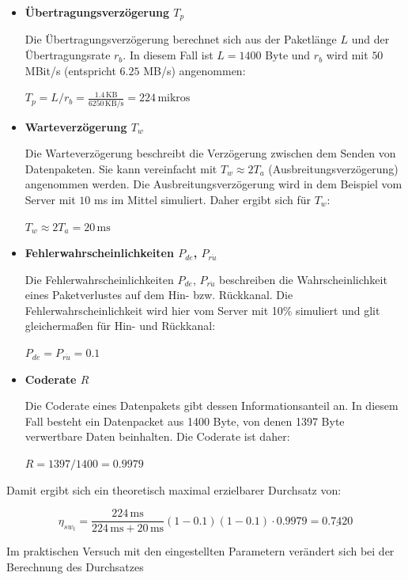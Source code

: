 \documentclass{article}
\begin{document}
			\begin{itemize}

				\item \textbf{Übertragungsverzögerung $T_p$}

				Die Übertragungsverzögerung berechnet sich aus der Paketlänge $L$ und der Übertragungsrate $r_b$. In diesem Fall ist $L = 1400$ Byte und $r_b$ wird mit $50$ MBit/s (entspricht $6.25$ MB/s) angenommen:

				$T_p = L/r_b = \frac{1.4\,\text{KB}}{6250\,\text{KB/s}} = 224\,\text{mikros} $

				\item \textbf{Warteverzögerung $T_w$}

				Die Warteverzögerung beschreibt die Verzögerung zwischen dem Senden von Datenpaketen. Sie kann vereinfacht mit $T_w \approx 2T_a$ (Ausbreitungsverzögerung) angenommen werden. Die Ausbreitungsverzögerung wird in dem Beispiel vom Server mit $10$ ms im Mittel simuliert. Daher ergibt sich für $T_w$:

				$T_w \approx 2T_a = 20 \,\text{ms}$ 

				\item \textbf{Fehlerwahrscheinlichkeiten $P_{de}$, $P_{r\ddot{u}}$}

				Die Fehlerwahrscheinlichkeiten $P_{de}$, $P_{r\ddot{u}}$ beschreiben die Wahrscheinlichkeit eines Paketverlustes auf dem Hin- bzw. Rückkanal. Die Fehlerwahrscheinlichkeit wird hier vom Server mit 10\% simuliert und glit gleichermaßen für Hin- und Rückkanal:

				$P_{de} = P_{r\ddot{u}} = 0.1$

				\item \textbf{Coderate $R$}

				Die Coderate eines Datenpakets gibt dessen Informationsanteil an. In diesem Fall besteht ein Datenpacket aus 1400 Byte, von denen 1397 Byte verwertbare Daten beinhalten. Die Coderate ist daher:

				$R = 1397/1400 = 0.9979$
			\end{itemize}

			Damit ergibt sich ein theoretisch maximal erzielbarer Durchsatz von:

			\begin{equation*}
				\eta_{sw_t} = \frac{224\,\text{ms}}{224\,\text{ms} + 20\,\text{ms}}(1-0.1)(1-0.1) \cdot 0.9979 = \underline{0.7420} 
			\end{equation*}

			Im praktischen Versuch mit den eingestellten Parametern verändert sich bei der Berechnung des Durchsatzes
\end{document}
